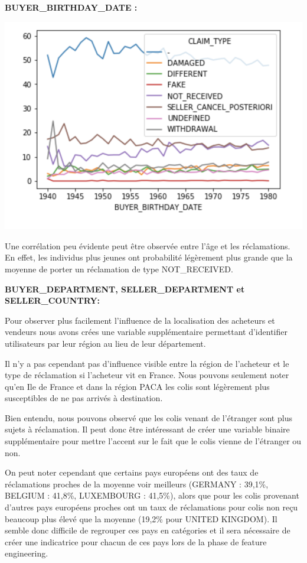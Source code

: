 \textbf{BUYER_BIRTHDAY_DATE :}

\begin{center}
\includegraphics[scale=0.5]{assets/age} 
\end{center}

Une corrélation peu évidente peut être observée entre l'âge et les réclamations. 
En effet, les individus plus jeunes ont probabilité légèrement plus grande que la moyenne
de porter un réclamation de type NOT_RECEIVED.

\textbf{BUYER_DEPARTMENT, SELLER_DEPARTMENT et SELLER_COUNTRY:}

Pour observer plus facilement l'influence de la localisation des acheteurs et vendeurs
nous avons crées une variable supplémentaire permettant d'identifier utilisateurs par leur
région au lieu de leur département. 

Il n'y a pas cependant pas d'influence visible entre la région de l'acheteur et le type de
réclamation si l'acheteur vit en France. Nous pouvons seulement noter qu'en Ile de France
et dans la région PACA les colis sont légèrement plus susceptibles de ne pas arrivés
à destination.

Bien entendu, nous pouvons observé que les colis venant de l'étranger sont plus sujets à 
réclamation. Il peut donc être intéressant de créer une variable binaire supplémentaire 
pour mettre l'accent sur le fait que le colis vienne de l'étranger ou non.

On peut noter cependant que certains pays européens ont des taux de réclamations 
proches de la moyenne voir meilleurs (GERMANY : 39,1\%, BELGIUM : 41,8\%, LUXEMBOURG : 41,5\%),
alors que pour les colis provenant d'autres pays européens proches ont un taux de réclamations pour colis 
non reçu beaucoup plus élevé que la moyenne (19,2\% pour UNITED KINGDOM). 
Il semble donc difficile de regrouper ces pays en catégories et il sera nécessaire de créer
une indicatrice pour chacun de ces pays lors de la phase de feature engineering.

